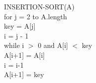 \documentclass{article}
\begin{document}
\noindent
INSERTION-SORT(A)\\
\indent	for j = 2 to A.length\\
\indent	\indent	key = A[j]\\
\indent	\indent	i = j - 1\\
\indent	\indent	while i $>$ 0 and A[i] $<$ key\\
\indent	\indent	\indent	A[i+1] = A[i]\\
\indent	\indent	\indent	i = i-1\\
\indent	\indent	A[i+1] = key\\
\end{document}
